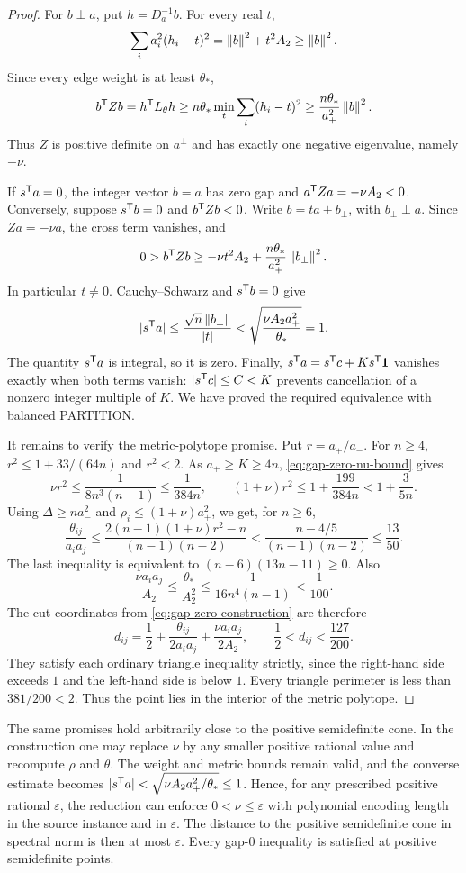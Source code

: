 \begin{proof}
For $b\perp a$, put $h=D_a^{-1}b$. For every real $t$,
\[
 \sum_i a_i^2(h_i-t)^2=\left\lVert b\right\rVert^2+t^2A_2\ge\left\lVert b\right\rVert^2.
\]
Since every edge weight is at least $\theta_*$,
\[
 b^{\mathsf T} Zb=h^{\mathsf T} L_\theta h
 \ge n\theta_*\min_t\sum_i(h_i-t)^2
 \ge\frac{n\theta_*}{a_+^2}\left\lVert b\right\rVert^2.
\]
Thus $Z$ is positive definite on $a^\perp$ and has exactly one negative
eigenvalue, namely $-\nu$.

If $s^{\mathsf T} a=0$, the integer vector $b=a$ has zero gap and
$a^{\mathsf T} Za=-\nu A_2<0$. Conversely, suppose
$s^{\mathsf T} b=0$ and $b^{\mathsf T} Zb<0$. Write $b=ta+b_\perp$, with
$b_\perp\perp a$. Since $Za=-\nu a$, the cross term vanishes, and
\[
 0> b^{\mathsf T} Zb
 \ge-\nu t^2A_2+
       \frac{n\theta_*}{a_+^2}\left\lVert b_\perp\right\rVert^2.
\]
In particular $t\ne0$. Cauchy--Schwarz and $s^{\mathsf T} b=0$ give
\[
 |s^{\mathsf T} a|
 \le\frac{\sqrt n\left\lVert b_\perp\right\rVert}{|t|}
 <\sqrt{\frac{\nu A_2a_+^2}{\theta_*}}=1.
\]
The quantity $s^{\mathsf T} a$ is integral, so it is zero. Finally,
$s^{\mathsf T} a=s^{\mathsf T} c+K s^{\mathsf T}\mathbf 1$ vanishes exactly when both terms
vanish: $|s^{\mathsf T} c|\le C<K$ prevents cancellation of a nonzero
integer multiple of $K$. We have proved the required equivalence with
balanced PARTITION.

It remains to verify the metric-polytope promise. Put $r=a_+/a_-$.
For $n\ge4$, $r^2\le1+33/(64n)$ and $r^2<2$. As $a_+\ge K\ge4n$,
\eqref{eq:gap-zero-nu-bound} gives
\[
 \nu r^2\le\frac1{8n^3(n-1)}\le\frac1{384n},
 \qquad
 (1+\nu)r^2\le1+\frac{199}{384n}<1+\frac3{5n}.
\]
Using $\Delta\ge na_-^2$ and
$\rho_i\le(1+\nu)a_+^2$, we get, for $n\ge6$,
\[
 \frac{\theta_{ij}}{a_ia_j}
 \le\frac{2(n-1)(1+\nu)r^2-n}{(n-1)(n-2)}
 <\frac{n-4/5}{(n-1)(n-2)}\le\frac{13}{50}.
\]
The last inequality is equivalent to
$(n-6)(13n-11)\ge0$. Also
\[
 \frac{\nu a_ia_j}{A_2}
 \le\frac{\theta_*}{A_2^2}
 \le\frac1{16n^4(n-1)}<\frac1{100}.
\]
The cut coordinates from \eqref{eq:gap-zero-construction} are therefore
\[
 d_{ij}=\frac12+
         \frac{\theta_{ij}}{2a_ia_j}+
         \frac{\nu a_ia_j}{2A_2},
 \qquad \frac12<d_{ij}<\frac{127}{200}.
\]
They satisfy each ordinary triangle inequality strictly, since the
right-hand side exceeds $1$ and the left-hand side is below $1$.
Every triangle perimeter is less than $381/200<2$. Thus the point lies
in the interior of the metric polytope.
\end{proof}

The same promises hold arbitrarily close to the positive semidefinite
cone. In the construction one may replace $\nu$ by any smaller positive
rational value and recompute $\rho$ and $\theta$. The weight and metric
bounds remain valid, and the converse estimate becomes
$|s^{\mathsf T} a|<\sqrt{\nu A_2a_+^2/\theta_*}\le1$. Hence, for any prescribed
positive rational $\varepsilon$, the reduction can enforce
$0<\nu\le\varepsilon$ with polynomial encoding length in the source
instance and in $\varepsilon$. The distance to
the positive semidefinite cone in spectral norm is then at most
$\varepsilon$. Every gap-$0$ inequality is satisfied at positive
semidefinite points.

